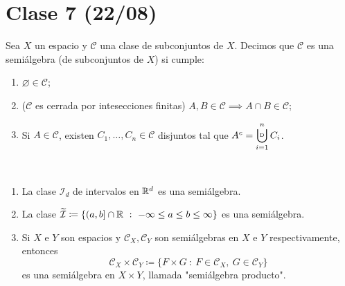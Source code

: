 \documentclass[a4paper]{report}
\newcommand{\bigcupd}{\mathop{\ensurestackMath{\stackinset{l}{}{c}{+.25ex}{\hspace{3pt}{\text{\tiny{D}}}}{\displaystyle{\bigcup}}}}}
\begin{document}
	\section{Clase 7 (22/08)}

	\begin{definition}[semiálgebra]
		Sea $X$ un espacio y $\mathscr{C}$ una clase de subconjuntos de $X$. Decimos que $\mathscr{C}$ es una semiálgebra (de subconjuntos de $X$) si cumple:
		\begin{enumerate}
			\item $\varnothing \in \mathscr{C}$;

			\item ($\mathscr{C}$ es cerrada por intesecciones finitas) $A,B\in\mathscr{C} \implies A \cap B \in \mathscr{C}$;
			
			\item Si $A \in \mathscr{C}$, existen $C_1,\dots,C_n \in \mathscr{C}$ disjuntos tal que $A^c = \displaystyle\bigcupd_{i=1}^{n} C_i$.
		\end{enumerate}
	\end{definition}
	
	\begin{eg}~
		\begin{enumerate}
			\item La clase $\mathcal{I}_d$ de intervalos en $\mathbb{R}^d$ es una semiálgebra.

			\item La clase $\widetilde{\mathcal{I}} \coloneq \{ (a,b] \cap \mathbb{R} \ : \ -\infty \leq a \leq b \leq \infty \}$ es una semiálgebra.

			\item Si $X$ e $Y$ son espacios y $\mathscr{C}_X, \mathscr{C}_Y$ son semiálgebras en $X$ e $Y$ respectivamente, entonces
			\[ \mathscr{C}_X \times \mathscr{C}_Y \coloneq \{ F \times G \ : \ F \in \mathscr{C}_X,\ G \in \mathscr{C}_Y \} \]
			es una semiálgebra en $X \times Y$, llamada "semiálgebra producto".
		\end{enumerate}
	\end{eg}
\end{document}
